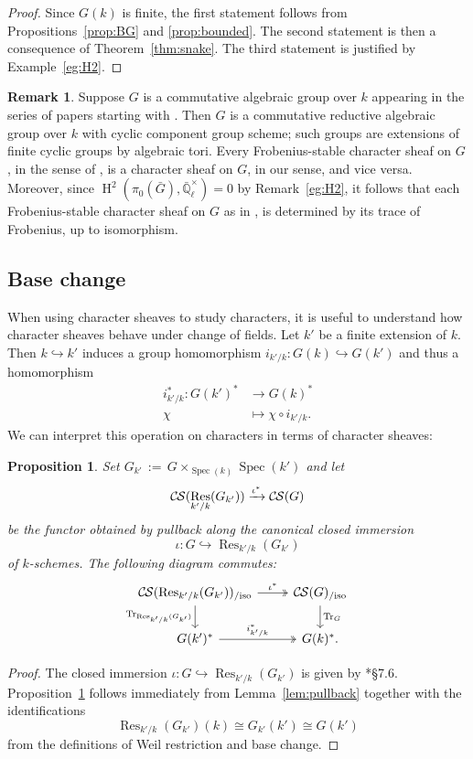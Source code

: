 \documentclass[10pt]{amsart}
\theoremstyle{plain}
\newtheorem{proposition}[theorem]{Proposition}
\theoremstyle{definition}
\newtheorem{remark}[theorem]{Remark}
\newcommand{\EE}{\mathbb{\bar Q}_\ell}
\newcommand{\Fq}{k}
\newcommand{\EEx}{\EE^\times}
\DeclareMathOperator{\Hh}{H}
\DeclareMathOperator{\Res}{Res}
\newcommand{\Spec}[1]{{\operatorname{Spec}(#1)}}
\newcommand{\ceq}{{\, :=\, }}
\newcommand{\TrFrob}[1]{\operatorname{Tr}_{#1}}
\newcommand{\CS}{{\mathcal{C\hskip-0.8pt S}}}
\newcommand{\CSiso}[1]{\CS(#1)_{/\text{iso}}}
\newcommand{\bG}{\bar{G}}
\begin{document}
\begin{proof}
Since $G(\Fq)$ is finite, the first statement follows from Propositions~\ref{prop:BG}
 and \ref{prop:bounded}. The second statement is then a consequence of Theorem~\ref{thm:snake}. 
 The third statement is justified by Example~\ref{eg:H2}.
 \end{proof}

\begin{remark}\label{rem:Lusztig}
Suppose $G$ is a commutative algebraic group over $\Fq$ appearing in the series of papers starting with \cite{lusztig:disconnected1}.
Then $G$ is a commutative reductive algebraic group over $\Fq$ with cyclic component group scheme;
such groups are extensions of finite cyclic groups by algebraic tori.
Every Frobenius-stable character sheaf on $G$, in the sense of \cite{lusztig:disconnected1}, is a character sheaf on $G$, in our sense,
and vice versa.
Moreover, since $\Hh^2(\pi_0(\bG),\EEx)=0$ by Remark~\ref{eg:H2}, it follows that each Frobenius-stable
character sheaf on $G$ as in \cite{lusztig:disconnected1}, is determined by its trace of Frobenius, up to isomorphism. 
\end{remark}

\subsection{Base change}\label{ssec:basechange}

When using character sheaves to study characters, it is useful to understand
how character sheaves behave under change of fields.
Let $k'$ be a finite extension of $k$. Then $k \hookrightarrow k'$ induces a group homomorphism
$i_{k'/k} : G(k) \hookrightarrow G(k')$ and thus a homomorphism
\begin{align*}
i_{k'/k}^* : G(k')^* &\to G(k)^* \\
\chi &\mapsto \chi\circ i_{k'/k}.
\end{align*}
We can interpret this operation on characters in terms of character sheaves:

\begin{proposition} \label{prop:csbe}
Set $G_{k'} \ceq G\times_\Spec{k} \Spec{k'}$ and let
\[
\CS(\Res_{k'/k}(G_{k'})) \xrightarrow{\iota^*} \CS(G)
\]
be the functor obtained by pullback along the canonical closed immersion 
\[\iota : G \hookrightarrow \Res_{k'/k}(G_{k'})\] of $k$-schemes.
The following diagram commutes:
\[
\begin{tikzcd}
\CSiso{\Res_{k'/k}(G_{k'})} \arrow[two heads]{r}{\iota^*} \dar[swap]{\TrFrob{\Res_{k'/k}(G_{k'})}} & \CSiso{G} \dar{\TrFrob{G}} \\
G(k')^* \arrow[two heads]{r}{i_{k'/k}^*} & G(k)^*.
\end{tikzcd}
\]
\end{proposition}
\begin{proof}
The closed immersion $\iota : G \hookrightarrow \Res_{k'/k}(G_{k'})$ is given by \cite{bosch-lutkebohmert-reynaud:NeronModels}*{\S 7.6}.
Proposition~\ref{prop:csbe} follows immediately from Lemma~\ref{lem:pullback} together with the identifications
\[
\Res_{k'/k}(G_{k'})(k) \cong G_{k'}(k') \cong G(k')
\]
from the definitions of Weil restriction and base change.
\end{proof}
\end{document}
